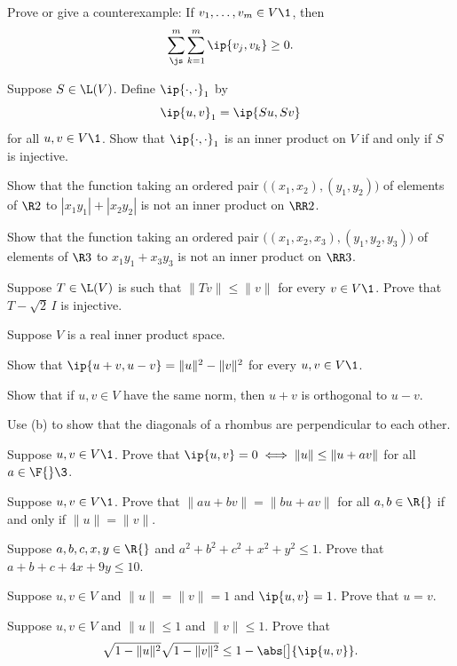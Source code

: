 
\exercise
Prove or give a counterexample: If $v_1, \dots, v_m \in V\1$, then
\[
\sum_{\js}^m \sum_{k=1}^m \ip{v_j, v_k} \ge 0.
\]
\vspace{-12bp}


\exercise
Suppose $S \in \L(V)$. Define $\ip{\cdot, \cdot}_1$ by
\[
\ip{u, v}_1 = \ip{Su, Sv}
\]
for all $u, v \in V\1$. Show that $\ip{\cdot, \cdot}_1$ is an inner product on $V$ if and only if $S$ is injective.


\exercise
\begin{SUBtheorem}
\item
Show that the function taking an ordered pair $\bigl( (x_1, x_2), (y_1, y_2) \bigr)$ of elements of $\R2$ to $|x_1 y_1| + |x_2 y_2|$ is not an inner product on $\RR2$.
\item
Show that the function taking an ordered pair $\bigl( (x_1, x_2, x_3), (y_1, y_2, y_3) \bigr)$ of elements of $\R3$ to $x_1 y_1 + x_3 y_3$ is not an inner product on $\RR3$.
\end{SUBtheorem}


\exercise
Suppose $T \in \L(V)$ is such that $\|Tv\| \le \|v\|$ for every $v \in V\1$. Prove that $ T - \sqrt{2}\, I$ is injective.


\exercise
Suppose $V$ is a real inner product space.
\begin{subtheorem}
\item
Show that $\ip{u + v, u - v} = \| u \|^2 - \| v \|^2$ for every $u, v \in V\1$.
\item
Show that if $u, v \in V$ have the same norm, then $u+v$ is orthogonal to $u-v$.
\item
Use (b) to show that the diagonals of a rhombus are perpendicular to each other.
\end{subtheorem}
\exercisesubtheoremend


\exercise
Suppose $u, v \in V\1$.  Prove that $\ip{u,v} = 0 \iff
\|u\| \le \|u + av\|
$
for all $a \in \F{}\3$.\label{orthognorm}


\exercise
Suppose $u, v \in V\1$. Prove that $\|au + bv\| = \|bu + av\|$ for all $a, b \in \R{}$ if and only if $\|u\| = \|v\|$.


\exercise
Suppose $a,b,c,x, y \in \R{}$ and $a^2 + b^2 + c^2 + x^2 + y^2 \le 1$. Prove that $a + b + c +4x + 9y \le 10$.


\exercise
Suppose $u, v \in V$ and $\| u \| = \|v \| = 1$ and $\ip{u, v} = 1$. Prove that $u = v$.


\exercise
Suppose $u, v \in V$ and $\|u\| \le 1$ and $\|v\| \le 1$. Prove that
\[
\sqrt{ 1 - \|u\|^2} \sqrt{ 1 - \|v\|^2} \le 1 - \abs[\big]{\ip{u, v}}.
\]
\exercisedisplayend


